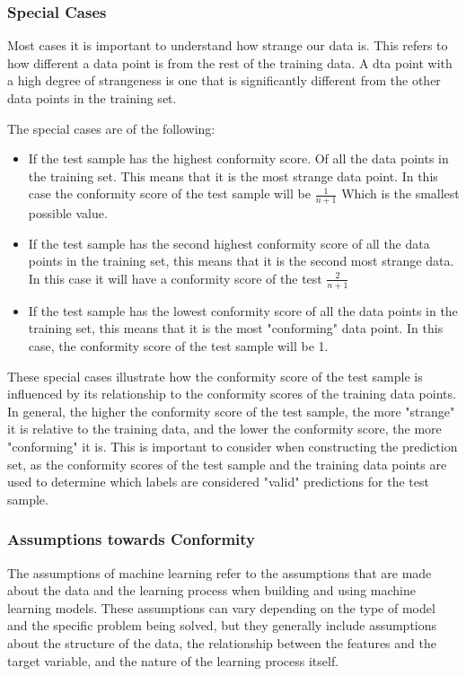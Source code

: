 \documentclass{article}
\theoremstyle{mytheoremstyle}
\theoremstyle{mytheoremstyle}
\theoremstyle{myproblemstyle}
\begin{document}
\subsubsection{Special Cases}
Most cases it is important to understand how strange our data is. This refers to how different a data point is from the rest of the training data. A dta point with a high degree of strangeness is one that is significantly different from the other data points in the training set.

The special cases are of the following: 
\begin{itemize}
	\item If the test sample has the highest conformity score. Of all the data points in the training set. This means that it is the most strange data point. In this case the conformity score of the test sample will be $ \frac{1}{n+1} $ Which is the smallest possible value.
	\item If the test sample has the second highest conformity score of all the data points in the training set, this means that it is the second most strange data. In this case it will have a conformity score of the test
	      $\frac{2}{n+1}$
	\item If the test sample has the lowest conformity score of all the data points in the training set, this means that it is the most "conforming" data point. In this case, the conformity score of the test sample will be 1.

\end{itemize}
These special cases illustrate how the conformity score of the test sample is influenced by its relationship to the conformity scores of the training data points. In general, the higher the conformity score of the test sample, the more "strange" it is relative to the training data, and the lower the conformity score, the more "conforming" it is. This is important to consider when constructing the prediction set, as the conformity scores of the test sample and the training data points are used to determine which labels are considered "valid" predictions for the test sample.

\subsubsection{Assumptions towards Conformity}
The assumptions of machine learning refer to the assumptions that are made about the data and the learning process when building and using machine learning models. These assumptions can vary depending on the type of model and the specific problem being solved, but they generally include assumptions about the structure of the data, the relationship between the features and the target variable, and the nature of the learning process itself.
\end{document}
